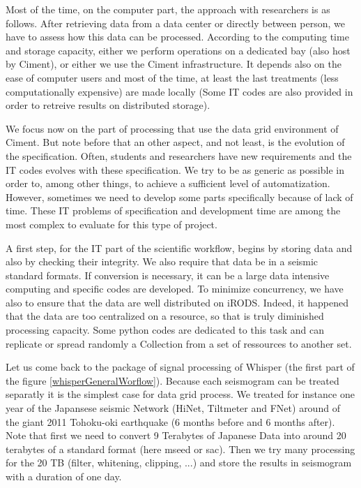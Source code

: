 \documentclass[a4paper, 10pt]{article}
\begin{document}
\begin{multicols}{2}
Most of the time, on the computer part, the approach with researchers is as follows.
After retrieving data from a data center or directly between person, we have to assess how this data can be processed.
According to the computing time and storage capacity, either we perform operations on a dedicated bay (also host by Ciment), or either we use the Ciment infrastructure.
It depends also on the ease of computer users and most of the time, at least the last treatments (less computationally expensive) are made locally
(Some IT codes are also provided in order to retreive results on distributed storage).


We focus now on the part of processing that use the data grid environment of Ciment.
But note before that an other aspect, and not least, is the evolution of the specification. 
Often, students and researchers have new requirements and the IT codes evolves with these specification.
We try to be as generic as possible in order to, among other things, to achieve a sufficient level of automatization.
However, sometimes we need to develop some parts specifically because of lack of time.
These IT problems of specification and development time are among the most complex to evaluate for this type of project.


A first step, for the IT part of the scientific workflow, begins by storing data and also by checking their integrity.
We also require that data be in a seismic standard formats.
If conversion is necessary, it can be a large data intensive computing and specific codes are developed.
To minimize concurrency, we have also to ensure that the data are well distributed on iRODS. 
Indeed, it happened that the data are too centralized on a resource, so that is truly diminished processing capacity.
Some python codes are dedicated to this task and can replicate or spread randomly a Collection from a set of ressources to another set.


Let us come back to the package of signal processing of Whisper (the first part of the figure \ref{whisperGeneralWorflow}).
Because each seismogram can be treated separatly it is the simplest case for data grid process. We treated for instance one year of the
Japansese seismic Network (HiNet, Tiltmeter and FNet) around of the giant 2011 Tohoku-oki earthquake (6 months before and 6 months after).
Note that first we need to convert 9 Terabytes of Japanese Data into around 20 terabytes of a standard format (here mseed or sac).
Then we try many processing for the 20 TB (filter, whitening, clipping, ...) and store the results in seismogram with a duration of one day.



\end{multicols}
\end{document}
